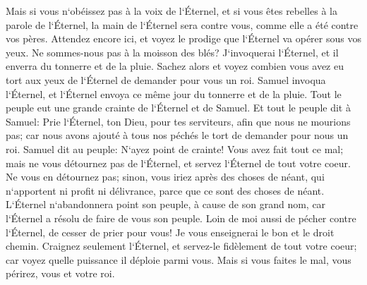 \verse Mais si vous n`obéissez pas à la voix de l`Éternel, et si vous êtes rebelles à la parole de l`Éternel, la main de l`Éternel sera contre vous, comme elle a été contre vos pères. 
\verse Attendez encore ici, et voyez le prodige que l`Éternel va opérer sous vos yeux. 
\verse Ne sommes-nous pas à la moisson des blés? J`invoquerai l`Éternel, et il enverra du tonnerre et de la pluie. Sachez alors et voyez combien vous avez eu tort aux yeux de l`Éternel de demander pour vous un roi. 
\verse Samuel invoqua l`Éternel, et l`Éternel envoya ce même jour du tonnerre et de la pluie. Tout le peuple eut une grande crainte de l`Éternel et de Samuel. 
\verse Et tout le peuple dit à Samuel: Prie l`Éternel, ton Dieu, pour tes serviteurs, afin que nous ne mourions pas; car nous avons ajouté à tous nos péchés le tort de demander pour nous un roi. 
\verse Samuel dit au peuple: N`ayez point de crainte! Vous avez fait tout ce mal; mais ne vous détournez pas de l`Éternel, et servez l`Éternel de tout votre coeur. 
\verse Ne vous en détournez pas; sinon, vous iriez après des choses de néant, qui n`apportent ni profit ni délivrance, parce que ce sont des choses de néant. 
\verse L`Éternel n`abandonnera point son peuple, à cause de son grand nom, car l`Éternel a résolu de faire de vous son peuple. 
\verse Loin de moi aussi de pécher contre l`Éternel, de cesser de prier pour vous! Je vous enseignerai le bon et le droit chemin. 
\verse Craignez seulement l`Éternel, et servez-le fidèlement de tout votre coeur; car voyez quelle puissance il déploie parmi vous. 
\verse Mais si vous faites le mal, vous périrez, vous et votre roi. 

